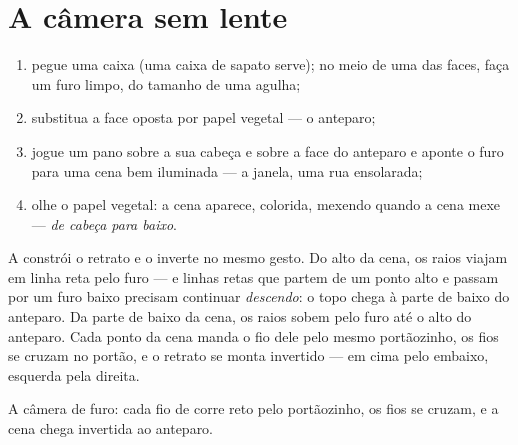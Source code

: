 \section{A câmera sem lente}

\begin{method}\label{met:g6:light-propagation:pinhole}
\begin{enumerate}
  \item pegue uma caixa (uma caixa de sapato serve); no meio de uma
        das faces, faça um furo limpo, do tamanho de uma agulha;
  \item substitua a face oposta por papel vegetal --- o anteparo;
  \item jogue um pano sobre a sua cabeça e sobre a face do anteparo e
        aponte o furo para uma cena bem iluminada --- a janela, uma
        rua ensolarada;
  \item olhe o papel vegetal: a cena aparece, colorida, mexendo
        quando a cena mexe --- \emph{de cabeça para baixo}.
\end{enumerate}
\end{method}

\begin{proposition}\label{prop:g6:light-propagation:inverted}
A  constrói o retrato e o inverte no mesmo gesto.
Do alto da cena, os raios viajam em linha reta pelo furo --- e linhas
retas que partem de um ponto alto e passam por um furo baixo precisam
continuar \emph{descendo}: o topo chega à parte de baixo do anteparo.
Da parte de baixo da cena, os raios sobem pelo furo até o alto do
anteparo. Cada ponto da cena manda o fio dele pelo mesmo portãozinho,
os fios se cruzam no portão, e o retrato se monta invertido --- em
cima pelo embaixo, esquerda pela direita.
\end{proposition}

\begin{omfigure}

{\small A câmera de furo: cada fio de  corre reto pelo
portãozinho, os fios se cruzam, e a cena chega invertida ao
anteparo.}
\end{omfigure}

